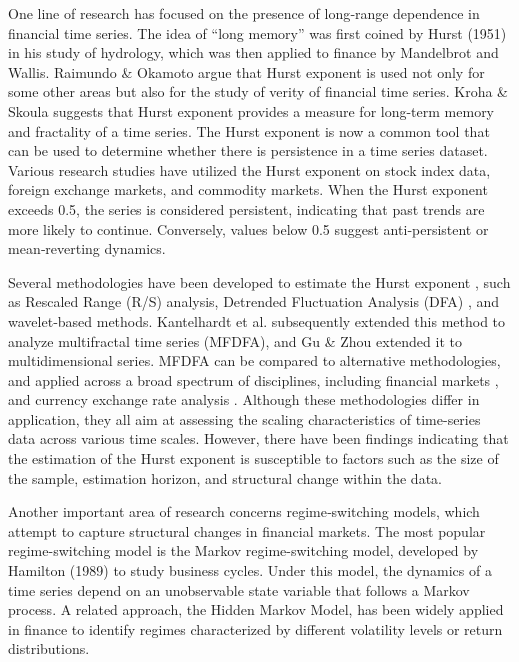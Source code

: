 \documentclass[12pt]{article}
\begin{document}
One line of research has focused on the presence of long‑range dependence in financial time series. The idea of “long memory” was first coined by Hurst (1951) in his study of hydrology, which was then applied to finance by Mandelbrot and Wallis. Raimundo \& Okamoto \cite{raimundo2018} argue that Hurst exponent is used not only for some other areas but also for the study of verity of financial time series. Kroha \& Skoula \cite{kroha2018} suggests that Hurst exponent provides a measure for long-term memory and fractality of a time series. The Hurst exponent is now a common tool that can be used to determine whether there is persistence in a time series dataset. Various research studies have utilized the Hurst exponent on stock index data, foreign exchange markets, and commodity markets. When the Hurst exponent exceeds 0.5, the series is considered persistent, indicating that past trends are more likely to continue. Conversely, values below 0.5 suggest anti‑persistent or mean‑reverting dynamics.

Several methodologies have been developed to estimate the Hurst exponent \cite{beran1994}, such as Rescaled Range (R/S) analysis, Detrended Fluctuation Analysis (DFA) \cite{peng1994}, and wavelet‑based methods. Kantelhardt et al. \cite{kantelhardt2002} subsequently extended this method to analyze multifractal time series (MFDFA), and Gu \& Zhou \cite{gu2006} extended it to multidimensional series. MFDFA can be compared to alternative methodologies, and applied across a broad spectrum of disciplines, including financial markets \cite{oswiecimka2005,yuan2009,thompson2016,xiong2017,teng2018}, and currency exchange rate analysis \cite{li2020,shang2020,li2021}. Although these methodologies differ in application, they all aim at assessing the scaling characteristics of time-series data across various time scales. However, there have been findings indicating that the estimation of the Hurst exponent is susceptible to factors such as the size of the sample, estimation horizon, and structural change within the data.

Another important area of research concerns regime‑switching models, which attempt to capture structural changes in financial markets. The most popular regime-switching model is the Markov regime-switching model, developed by Hamilton (1989) to study business cycles. Under this model, the dynamics of a time series depend on an unobservable state variable that follows a Markov process. A related approach, the Hidden Markov Model, has been widely applied in finance to identify regimes characterized by different volatility levels or return distributions.
\end{document}

